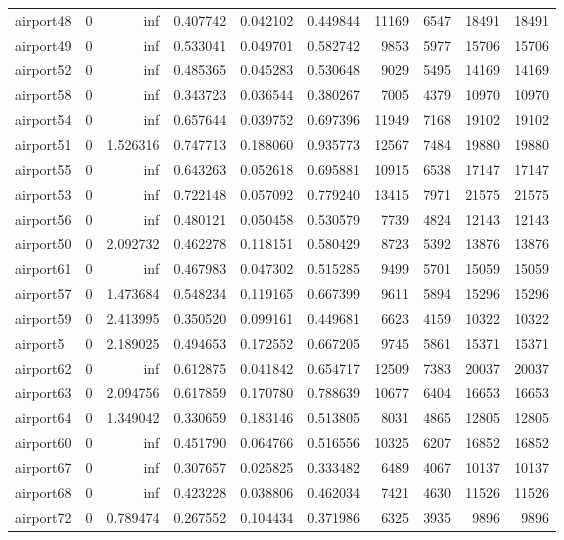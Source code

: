 \begin{longtable}{|l|r|r|r|r|r|r|r|r|r|}
airport48 & 0 & inf & 0.407742 & 0.042102 & 0.449844 & 11169 & 6547 & 18491 & 18491 \\
airport49 & 0 & inf & 0.533041 & 0.049701 & 0.582742 & 9853 & 5977 & 15706 & 15706 \\
airport52 & 0 & inf & 0.485365 & 0.045283 & 0.530648 & 9029 & 5495 & 14169 & 14169 \\
airport58 & 0 & inf & 0.343723 & 0.036544 & 0.380267 & 7005 & 4379 & 10970 & 10970 \\
airport54 & 0 & inf & 0.657644 & 0.039752 & 0.697396 & 11949 & 7168 & 19102 & 19102 \\
airport51 & 0 & 1.526316 & 0.747713 & 0.188060 & 0.935773 & 12567 & 7484 & 19880 & 19880 \\
airport55 & 0 & inf & 0.643263 & 0.052618 & 0.695881 & 10915 & 6538 & 17147 & 17147 \\
airport53 & 0 & inf & 0.722148 & 0.057092 & 0.779240 & 13415 & 7971 & 21575 & 21575 \\
airport56 & 0 & inf & 0.480121 & 0.050458 & 0.530579 & 7739 & 4824 & 12143 & 12143 \\
airport50 & 0 & 2.092732 & 0.462278 & 0.118151 & 0.580429 & 8723 & 5392 & 13876 & 13876 \\
airport61 & 0 & inf & 0.467983 & 0.047302 & 0.515285 & 9499 & 5701 & 15059 & 15059 \\
airport57 & 0 & 1.473684 & 0.548234 & 0.119165 & 0.667399 & 9611 & 5894 & 15296 & 15296 \\
airport59 & 0 & 2.413995 & 0.350520 & 0.099161 & 0.449681 & 6623 & 4159 & 10322 & 10322 \\
airport5 & 0 & 2.189025 & 0.494653 & 0.172552 & 0.667205 & 9745 & 5861 & 15371 & 15371 \\
airport62 & 0 & inf & 0.612875 & 0.041842 & 0.654717 & 12509 & 7383 & 20037 & 20037 \\
airport63 & 0 & 2.094756 & 0.617859 & 0.170780 & 0.788639 & 10677 & 6404 & 16653 & 16653 \\
airport64 & 0 & 1.349042 & 0.330659 & 0.183146 & 0.513805 & 8031 & 4865 & 12805 & 12805 \\
airport60 & 0 & inf & 0.451790 & 0.064766 & 0.516556 & 10325 & 6207 & 16852 & 16852 \\
airport67 & 0 & inf & 0.307657 & 0.025825 & 0.333482 & 6489 & 4067 & 10137 & 10137 \\
airport68 & 0 & inf & 0.423228 & 0.038806 & 0.462034 & 7421 & 4630 & 11526 & 11526 \\
airport72 & 0 & 0.789474 & 0.267552 & 0.104434 & 0.371986 & 6325 & 3935 & 9896 & 9896 \\

\end{longtable}
